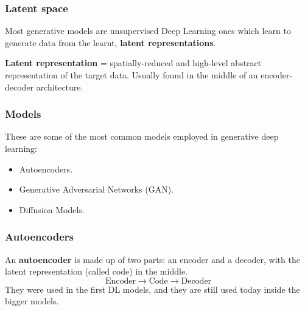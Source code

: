 \begin{frame}
    \frametitle{Latent space}
    Most generative models are unsupervised Deep Learning ones which learn to generate data from the learnt, \textbf{latent representations}.

    \textbf{Latent representation} = spatially-reduced and high-level abstract representation of the target data. Usually found in the middle of an encoder-decoder architecture.
\end{frame}

\begin{frame}
    \frametitle{Models}
    These are some of the most common models employed in generative deep learning:
    \begin{itemize}
        \item Autoencoders.
        \item Generative Adversarial Networks (GAN).
        \item Diffusion Models.
    \end{itemize}
\end{frame}

\begin{frame}
    \frametitle{Autoencoders}
    An \textbf{autoencoder} is made up of two parts: an encoder and a decoder, with the latent representation (called code) in the middle.
    $$\text{Encoder} \to \text{Code} \to \text{Decoder}$$
    They were used in the first DL models, and they are still used today inside the bigger models.
\end{frame}